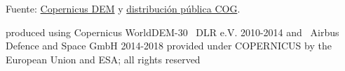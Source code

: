 Fuente: \href{https://doi.org/10.5270/ESA-c5d3d65}{Copernicus DEM} y
\href{https://copernicus-dem-30m.s3.amazonaws.com/readme.html}{distribución pública COG}.

{\footnotesize produced using Copernicus WorldDEM-30 \textcopyright\ DLR e.V.
2010-2014 and \textcopyright\ Airbus Defence and Space GmbH 2014-2018 provided
under COPERNICUS by the European Union and ESA; all rights reserved}

